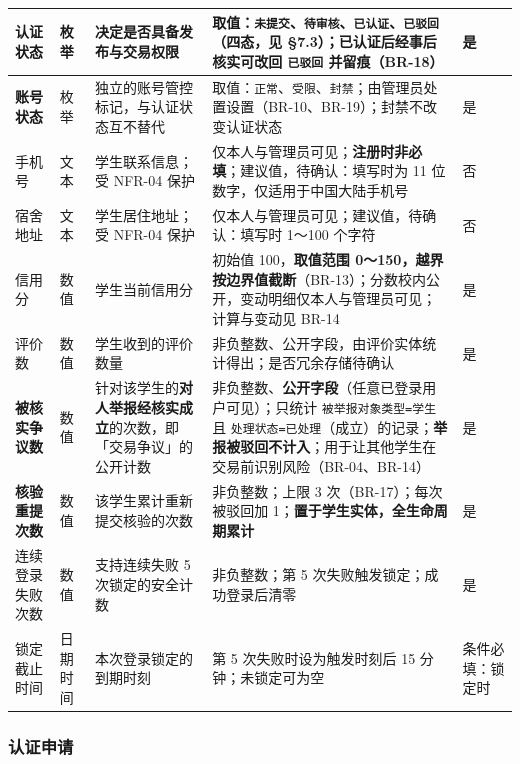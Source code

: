 \documentclass[12pt,a4paper]{ctexart}
\begin{document}
{\begin{longtable}{|p{1.48cm}|p{1.48cm}|p{3.76cm}|p{7.73cm}|p{1.54cm}|}
认证状态 & 枚举 & 决定是否具备发布与交易权限 & 取值：\texttt{未提交}、\texttt{待审核}、\texttt{已认证}、\texttt{已驳回}（四态，见 §7.3）；已认证后经事后核实可改回 \texttt{已驳回} 并留痕（BR-18） & 是 \\
\hline
\textbf{账号状态} & 枚举 & 独立的账号管控标记，与认证状态互不替代 & 取值：\texttt{正常}、\texttt{受限}、\texttt{封禁}；由管理员处置设置（BR-10、BR-19）；封禁不改变认证状态 & 是 \\
\hline
手机号 & 文本 & 学生联系信息；受 NFR-04 保护 & 仅本人与管理员可见；\textbf{注册时非必填}；建议值，待确认：填写时为 11 位数字，仅适用于中国大陆手机号 & 否 \\
\hline
宿舍地址 & 文本 & 学生居住地址；受 NFR-04 保护 & 仅本人与管理员可见；建议值，待确认：填写时 1～100 个字符 & 否 \\
\hline
信用分 & 数值 & 学生当前信用分 & 初始值 100，\textbf{取值范围 0～150，越界按边界值截断}（BR-13）；分数校内公开，变动明细仅本人与管理员可见；计算与变动见 BR-14 & 是 \\
\hline
评价数 & 数值 & 学生收到的评价数量 & 非负整数、公开字段，由评价实体统计得出；是否冗余存储待确认 & 是 \\
\hline
\textbf{被核实争议数} & 数值 & 针对该学生的\textbf{对人举报经核实成立}的次数，即「交易争议」的公开计数 & 非负整数、\textbf{公开字段}（任意已登录用户可见）；只统计 \texttt{被举报对象类型=学生} 且 \texttt{处理状态=已处理}（成立）的记录；\textbf{举报被驳回不计入}；用于让其他学生在交易前识别风险（BR-04、BR-14） & 是 \\
\hline
\textbf{核验重提次数} & 数值 & 该学生累计重新提交核验的次数 & 非负整数；上限 3 次（BR-17）；每次被驳回加 1；\textbf{置于学生实体，全生命周期累计} & 是 \\
\hline
连续登录失败次数 & 数值 & 支持连续失败 5 次锁定的安全计数 & 非负整数；第 5 次失败触发锁定；成功登录后清零 & 是 \\
\hline
锁定截止时间 & 日期时间 & 本次登录锁定的到期时刻 & 第 5 次失败时设为触发时刻后 15 分钟；未锁定可为空 & 条件必填：锁定时 \\
\hline
\end{longtable}
}



\subsubsection*{认证申请}
\end{document}
